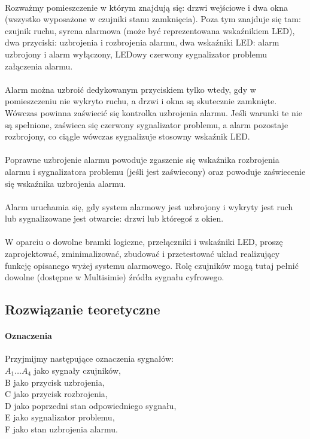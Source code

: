 \documentclass{article}
\begin{document}
\paragraph{}
Rozważmy pomieszczenie w którym znajdują się: drzwi wejściowe i dwa okna (wszystko wyposażone w czujniki stanu zamknięcia). Poza tym znajduje się tam: czujnik ruchu, syrena alarmowa (może być reprezentowana wskaźnikiem LED), dwa przyciski: uzbrojenia i rozbrojenia alarmu, dwa wskaźniki LED: alarm uzbrojony i alarm wyłączony, LEDowy czerwony sygnalizator problemu załączenia alarmu.
\paragraph{}
Alarm można uzbroić dedykowanym przyciskiem tylko wtedy, gdy w pomieszczeniu nie wykryto ruchu, a drzwi i okna są skutecznie zamknięte. Wówczas powinna zaświecić się kontrolka uzbrojenia alarmu. Jeśli warunki te nie są spełnione, zaświeca się czerwony sygnalizator problemu, a alarm pozostaje rozbrojony, co ciągle wówczas sygnalizuje stosowny wskaźnik LED.
\paragraph{}
Poprawne uzbrojenie alarmu powoduje zgaszenie się wskaźnika rozbrojenia alarmu i sygnalizatora problemu (jeśli jest zaświecony) oraz powoduje zaświecenie się wskaźnika uzbrojenia alarmu.
\paragraph{}
Alarm uruchamia się, gdy system alarmowy jest uzbrojony i wykryty jest ruch lub sygnalizowane jest otwarcie: drzwi lub któregoś z okien.
\paragraph{}
W oparciu o dowolne bramki logiczne, przełączniki i wskaźniki LED, proszę zaprojektować, zminimalizować, zbudować i przetestować układ realizujący funkcję opisanego wyżej systemu alarmowego. Rolę czujników mogą tutaj pełnić dowolne (dostępne w Multisimie) źródła sygnału cyfrowego.
\subsection{Rozwiązanie teoretyczne}
\paragraph{Oznaczenia}
Przyjmijmy następujące oznaczenia sygnałów: \\
$A_{1} \dots A_{4}$ jako sygnały czujników, \\
B jako przycisk uzbrojenia, \\
C jako przycisk rozbrojenia, \\
D jako poprzedni stan odpowiedniego sygnału, \\
E jako sygnalizator problemu, \\
F jako stan uzbrojenia alarmu.
\end{document}
